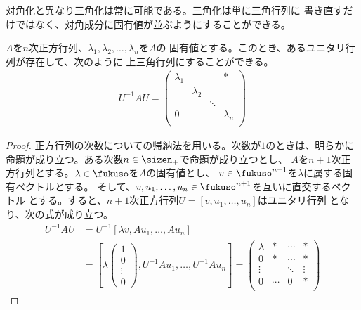 {	対角化と異なり三角化は常に可能である。三角化は単に三角行列に
	書き直すだけではなく、対角成分に固有値が並ぶようにすることができる。

	\begin{proposition}[正方行列の三角化]\label{prop:正方行列の三角化} %
		$A$を$n$次正方行列、$\lambda_1,\lambda_2,\dots,\lambda_n$を$A$の
		固有値とする。このとき、あるユニタリ行列が存在して、次のように
		上三角行列にすることができる。
		\begin{equation*}\begin{split}
			U^{-1}AU = 	\begin{pmatrix}
				\lambda_1 & & & * \\
				& \lambda_2 \\
				& & \ddots \\
				0 & & & \lambda_n \\
			\end{pmatrix}
		\end{split}\end{equation*}
	\end{proposition} %
	\begin{proof} %
		正方行列の次数についての帰納法を用いる。次数が$1$のときは、明らかに
		命題が成り立つ。ある次数$n\in\sizen_+$で命題が成り立つとし、
		$A$を$n+1$次正方行列とする。$\lambda\in\fukuso$を$A$の固有値とし、
		$v\in\fukuso^{n+1}$を$\lambda$に属する固有ベクトルとする。
		そして、$v,u_1,\dots,u_n\in\fukuso^{n+1}$を互いに直交するベクトル
		とする。すると、$n+1$次正方行列$U=[v,u_1,\dots,u_n]$はユニタリ行列
		となり、次の式が成り立つ。
		\begin{equation*}\begin{split}
			U^{-1}AU &= U^{-1}[\lambda v,Au_1,\dots,Au_n] \\
			&= \left[\lambda\begin{pmatrix}
				1 \\ 0 \\ \vdots \\ 0
			\end{pmatrix},U^{-1}Au_1,\dots,U^{-1}Au_n\right] = \begin{pmatrix}
				\lambda & * & \cdots & * \\
				0 & * & \cdots & * \\
				\vdots & & \ddots & \vdots \\
				0 & \cdots & 0 & * \\
			\end{pmatrix}
		\end{split}\end{equation*}

\end{proof}}
